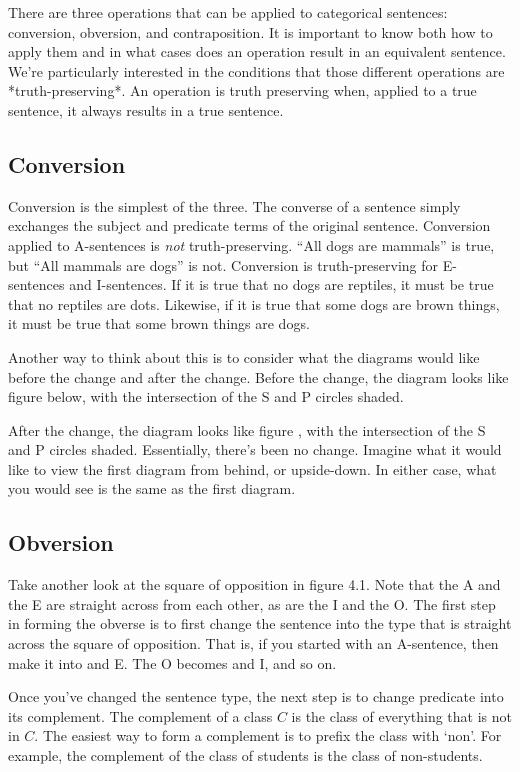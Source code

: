There are three operations that can be applied to categorical sentences: conversion, obversion, and contraposition. It is important to know both how to apply them and in what cases does an operation result in an equivalent sentence. We're particularly interested in the conditions that those different operations are *truth-preserving*. An operation is truth preserving when, applied to a true sentence, it always results in a true sentence.

\subsection{Conversion}


Conversion is the simplest of the three. The converse of a sentence simply exchanges the subject and predicate terms of the original sentence. Conversion applied to A-sentences is \emph{not} truth-preserving. \enquote{All dogs are mammals} is true, but \enquote{All mammals are dogs} is not. Conversion is truth-preserving for E-sentences and I-sentences. If it is true that no dogs are reptiles, it must be true that no reptiles are dots. Likewise, if it is true that some dogs are brown things, it must be true that some brown things are dogs.

Another way to think about this is to consider what the diagrams would like before the change and after the change. Before the change, the diagram looks like figure below, with the intersection of the S and P circles shaded.

After the change, the diagram looks like figure , with the intersection of the S and P circles shaded. Essentially, there's been no change. Imagine what it would like to view the first diagram from behind, or upside-down. In either case, what you would see is the same as the first diagram.


\subsection{Obversion}

Take another look at the square of opposition in figure 4.1. Note that the A and the E are straight across from each other, as are the I and the O. The first step in forming the obverse is to first change the sentence into the type that is straight across the square of opposition. That is, if you started with an A-sentence, then make it into and E. The O becomes and I, and so on.


Once you've changed the sentence type, the next step is to change predicate into its complement. The complement of a class $C$ is the class of everything that is not in $C$. The easiest way to form a complement is to prefix the class with `non'. For example, the complement of the class of students is the class of non-students.

